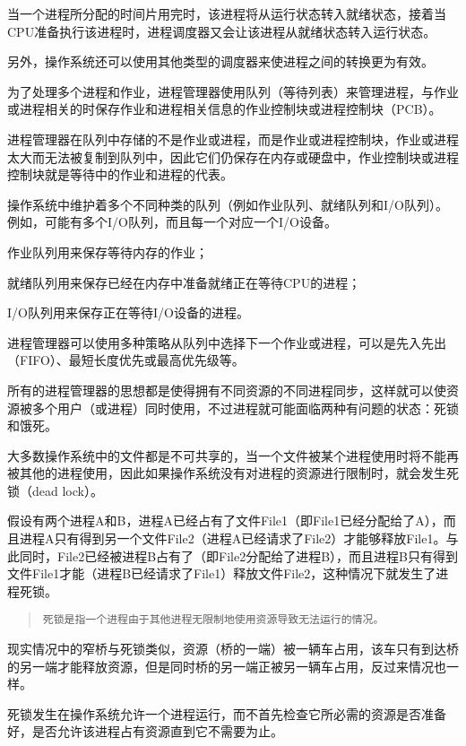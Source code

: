 当一个进程所分配的时间片用完时，该进程将从运行状态转入就绪状态，接着当CPU准备执行该进程时，进程调度器又会让该进程从就绪状态转入运行状态。


另外，操作系统还可以使用其他类型的调度器来使进程之间的转换更为有效。


为了处理多个进程和作业，进程管理器使用队列（等待列表）来管理进程，与作业或进程相关的时保存作业和进程相关信息的作业控制块或进程控制块（PCB）。

进程管理器在队列中存储的不是作业或进程，而是作业或进程控制块，作业或进程太大而无法被复制到队列中，因此它们仍保存在内存或硬盘中，作业控制块或进程控制块就是等待中的作业和进程的代表。

操作系统中维护着多个不同种类的队列（例如作业队列、就绪队列和I/O队列）。例如，可能有多个I/O队列，而且每一个对应一个I/O设备。

\begin{compactitem}
\item 作业队列用来保存等待内存的作业；
\item 就绪队列用来保存已经在内存中准备就绪正在等待CPU的进程；
\item I/O队列用来保存正在等待I/O设备的进程。
\end{compactitem}

进程管理器可以使用多种策略从队列中选择下一个作业或进程，可以是先入先出（FIFO）、最短长度优先或最高优先级等。


所有的进程管理器的思想都是使得拥有不同资源的不同进程同步，这样就可以使资源被多个用户（或进程）同时使用，不过进程就可能面临两种有问题的状态：死锁和饿死。

大多数操作系统中的文件都是不可共享的，当一个文件被某个进程使用时将不能再被其他的进程使用，因此如果操作系统没有对进程的资源进行限制时，就会发生死锁（dead lock）。


假设有两个进程A和B，进程A已经占有了文件File1（即File1已经分配给了A），而且进程A只有得到另一个文件File2（进程A已经请求了File2）才能够释放File1。与此同时，File2已经被进程B占有了（即File2分配给了进程B），而且进程B只有得到文件File1才能（进程B已经请求了File1）释放文件File2，这种情况下就发生了进程死锁。

\begin{quote}
\texttt{死锁是指一个进程由于其他进程无限制地使用资源导致无法运行的情况。}
\end{quote}


现实情况中的窄桥与死锁类似，资源（桥的一端）被一辆车占用，该车只有到达桥的另一端才能释放资源，但是同时桥的另一端正被另一辆车占用，反过来情况也一样。

死锁发生在操作系统允许一个进程运行，而不首先检查它所必需的资源是否准备好，是否允许该进程占有资源直到它不需要为止。

